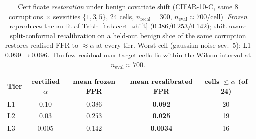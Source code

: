 \begin{table}[h]
\centering
\small
\begin{tabular}{lcccc}
\toprule
Tier & certified $\alpha$ & mean frozen FPR & mean recalibrated FPR & cells $\le\alpha$ (of 24) \\
\midrule
L1 & 0.10  & 0.386 & \textbf{0.092}   & 20 \\
L2 & 0.03  & 0.253 & \textbf{0.025}   & 19 \\
L3 & 0.005 & 0.142 & \textbf{0.0034}  & 16 \\
\bottomrule
\end{tabular}
\caption{%
  Certificate \emph{restoration} under benign covariate shift (CIFAR-10-C, same
  8 corruptions $\times$ severities $\{1,3,5\}$, 24 cells, $n_\text{recal}{=}300$,
  $n_\text{eval}{\approx}700$/cell). \emph{Frozen} reproduces the audit of
  Table~\ref{tab:cert_shift} ($0.386/0.253/0.142$); shift-aware split-conformal
  recalibration on a held-out benign slice of the same corruption restores
  realised FPR to ${\approx}\alpha$ at every tier. Worst cell (gaussian-noise
  sev.\ 5): L1 $0.999{\to}0.096$. The few residual over-target cells lie within
  the Wilson interval at $n_\text{eval}{\approx}700$.
}
\label{tab:cert_restore}
\end{table}
